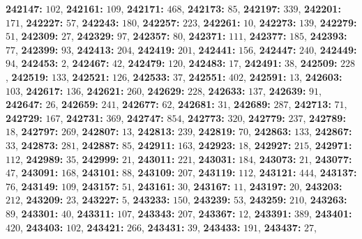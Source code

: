 \textsf{\bfseries 242147:} $102$, \textsf{\bfseries 242161:} $109$, \textsf{\bfseries 242171:} $468$, \textsf{\bfseries 242173:} $85$, \textsf{\bfseries 242197:} $339$, \textsf{\bfseries 242201:} $171$, \textsf{\bfseries 242227:} $57$, \textsf{\bfseries 242243:} $180$, \textsf{\bfseries 242257:} $223$, \textsf{\bfseries 242261:} $10$, \textsf{\bfseries 242273:} $139$, \textsf{\bfseries 242279:} $51$, \textsf{\bfseries 242309:} $27$, \textsf{\bfseries 242329:} $97$, \textsf{\bfseries 242357:} $80$, \textsf{\bfseries 242371:} $111$, \textsf{\bfseries 242377:} $185$, \textsf{\bfseries 242393:} $77$, \textsf{\bfseries 242399:} $93$, \textsf{\bfseries 242413:} $204$, \textsf{\bfseries 242419:} $201$, \textsf{\bfseries 242441:} $156$, \textsf{\bfseries 242447:} $240$, \textsf{\bfseries 242449:} $94$, \textsf{\bfseries 242453:} $2$, \textsf{\bfseries 242467:} $42$, \textsf{\bfseries 242479:} $120$, \textsf{\bfseries 242483:} $17$, \textsf{\bfseries 242491:} $38$, \textsf{\bfseries 242509:} $228$, \textsf{\bfseries 242519:} $133$, \textsf{\bfseries 242521:} $126$, \textsf{\bfseries 242533:} $37$, \textsf{\bfseries 242551:} $402$, \textsf{\bfseries 242591:} $13$, \textsf{\bfseries 242603:} $103$, \textsf{\bfseries 242617:} $136$, \textsf{\bfseries 242621:} $260$, \textsf{\bfseries 242629:} $228$, \textsf{\bfseries 242633:} $137$, \textsf{\bfseries 242639:} $91$, \textsf{\bfseries 242647:} $26$, \textsf{\bfseries 242659:} $241$, \textsf{\bfseries 242677:} $62$, \textsf{\bfseries 242681:} $31$, \textsf{\bfseries 242689:} $287$, \textsf{\bfseries 242713:} $71$, \textsf{\bfseries 242729:} $167$, \textsf{\bfseries 242731:} $369$, \textsf{\bfseries 242747:} $854$, \textsf{\bfseries 242773:} $320$, \textsf{\bfseries 242779:} $237$, \textsf{\bfseries 242789:} $18$, \textsf{\bfseries 242797:} $269$, \textsf{\bfseries 242807:} $13$, \textsf{\bfseries 242813:} $239$, \textsf{\bfseries 242819:} $70$, \textsf{\bfseries 242863:} $133$, \textsf{\bfseries 242867:} $33$, \textsf{\bfseries 242873:} $281$, \textsf{\bfseries 242887:} $85$, \textsf{\bfseries 242911:} $163$, \textsf{\bfseries 242923:} $18$, \textsf{\bfseries 242927:} $215$, \textsf{\bfseries 242971:} $112$, \textsf{\bfseries 242989:} $35$, \textsf{\bfseries 242999:} $21$, \textsf{\bfseries 243011:} $221$, \textsf{\bfseries 243031:} $184$, \textsf{\bfseries 243073:} $21$, \textsf{\bfseries 243077:} $47$, \textsf{\bfseries 243091:} $168$, \textsf{\bfseries 243101:} $88$, \textsf{\bfseries 243109:} $207$, \textsf{\bfseries 243119:} $112$, \textsf{\bfseries 243121:} $444$, \textsf{\bfseries 243137:} $76$, \textsf{\bfseries 243149:} $109$, \textsf{\bfseries 243157:} $51$, \textsf{\bfseries 243161:} $30$, \textsf{\bfseries 243167:} $11$, \textsf{\bfseries 243197:} $20$, \textsf{\bfseries 243203:} $212$, \textsf{\bfseries 243209:} $23$, \textsf{\bfseries 243227:} $5$, \textsf{\bfseries 243233:} $150$, \textsf{\bfseries 243239:} $53$, \textsf{\bfseries 243259:} $210$, \textsf{\bfseries 243263:} $89$, \textsf{\bfseries 243301:} $40$, \textsf{\bfseries 243311:} $107$, \textsf{\bfseries 243343:} $207$, \textsf{\bfseries 243367:} $12$, \textsf{\bfseries 243391:} $389$, \textsf{\bfseries 243401:} $420$, \textsf{\bfseries 243403:} $102$, \textsf{\bfseries 243421:} $266$, \textsf{\bfseries 243431:} $39$, \textsf{\bfseries 243433:} $191$, \textsf{\bfseries 243437:} $27$, 
